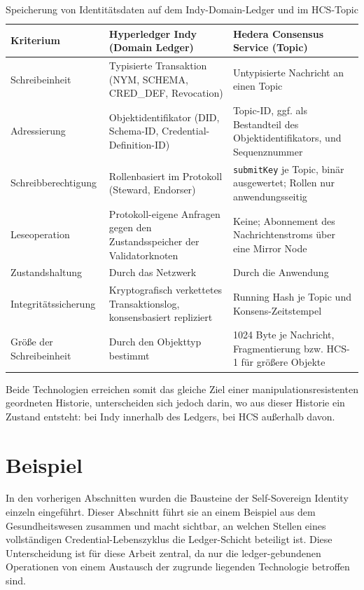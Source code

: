 \begin{table}[htbp]
\renewcommand{\arraystretch}{1.15}
\footnotesize
  \centering
  \caption{Speicherung von Identitätsdaten auf dem Indy-Domain-Ledger und im HCS-Topic}
  \label{tab:speichermodelle}
  \begin{tabular}{p{} p{} p{}}
    \toprule
    \textbf{Kriterium} & \textbf{Hyperledger Indy (Domain Ledger)} & \textbf{Hedera Consensus Service (Topic)} \\
    \midrule
    Schreibeinheit &
    Typisierte Transaktion (NYM, SCHEMA, CRED\_DEF, Revocation) &
    Untypisierte Nachricht an einen Topic \\
    Adressierung &
    Objektidentifikator (DID, Schema-ID, Credential-Definition-ID) &
    Topic-ID, ggf. als Bestandteil des Objektidentifikators, und Sequenznummer \\
    Schreibberechtigung &
    Rollenbasiert im Protokoll (Steward, Endorser) &
    \texttt{submitKey} je Topic, binär ausgewertet; Rollen nur anwendungsseitig \\
    Leseoperation &
    Protokoll-eigene Anfragen gegen den Zustandsspeicher der Validatorknoten &
    Keine; Abonnement des Nachrichtenstroms über eine Mirror Node \\
    Zustandshaltung &
    Durch das Netzwerk &
    Durch die Anwendung \\
    Integritätssicherung &
    Kryptografisch verkettetes Transaktionslog, konsensbasiert repliziert &
    Running Hash je Topic und Konsens-Zeitstempel \\
    Größe der Schreibeinheit &
    Durch den Objekttyp bestimmt &
    1024 Byte je Nachricht, Fragmentierung bzw. HCS-1 für größere Objekte \\
    \bottomrule
  \end{tabular}
\end{table}
\normalsize

Beide Technologien erreichen somit das gleiche Ziel einer manipulationsresistenten geordneten Historie, unterscheiden sich jedoch darin, wo aus dieser Historie ein Zustand entsteht: bei Indy innerhalb des Ledgers, bei HCS außerhalb davon.

\section{Beispiel}
\label{sec:grundlagen-beispiel}

In den vorherigen Abschnitten wurden die Bausteine der Self-Sovereign Identity einzeln eingeführt. Dieser Abschnitt führt sie an einem Beispiel aus dem Gesundheitswesen zusammen und macht sichtbar, an welchen Stellen eines vollständigen Credential-Lebenszyklus die Ledger-Schicht beteiligt ist. Diese Unterscheidung ist für diese Arbeit zentral, da nur die ledger-gebundenen Operationen von einem Austausch der zugrunde liegenden Technologie betroffen sind.

